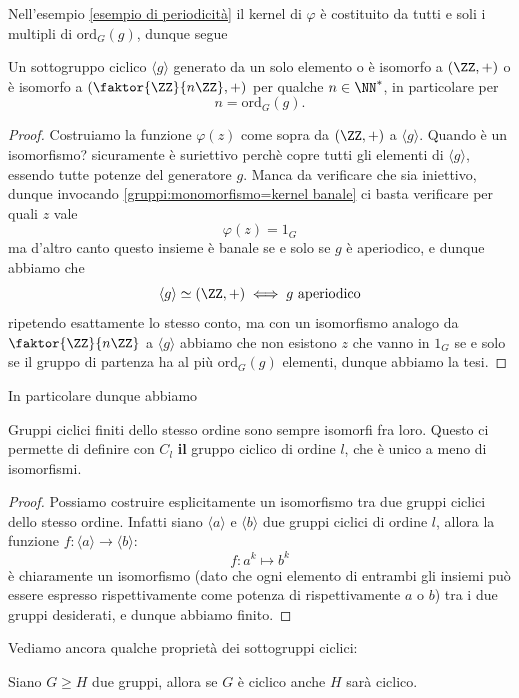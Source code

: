 \documentclass[11pt]{scrartcl}
\newcommand{\ordine}[2]{\text{ord}_{#1}\left(#2\right)}
\begin{document}
	
	Nell'esempio \ref{esempio di periodicità} il kernel di $\varphi$ è costituito da tutti e soli i multipli di $\ordine{G}{g}$, dunque segue
	\begin{corollary}
		Un sottogruppo ciclico $\langle g \rangle$ generato da un solo elemento o è isomorfo a $(\ZZ,+)$ o è isomorfo a $\left(\faktor{\ZZ}{n\ZZ},+\right)$ per qualche $n\in\NN^*$, in particolare per 
		$$n=\ordine{G}{g}.$$
	\end{corollary}
	\begin{proof}
		Costruiamo la funzione $\varphi(z)$ come sopra da $(\ZZ,+)$ a $\langle g \rangle$. Quando è un isomorfismo? sicuramente è suriettivo perchè copre tutti gli elementi di $\langle g \rangle$, essendo tutte potenze del generatore $g$. Manca da verificare che sia iniettivo, dunque invocando \ref{gruppi:monomorfismo=kernel banale} ci basta verificare per quali $z$ vale
		$$\varphi(z)=1_G$$
		ma d'altro canto questo insieme è banale se e solo se $g$ è aperiodico, e dunque abbiamo che 
		$$\langle g \rangle \simeq (\ZZ,+) \iff g \text{ aperiodico}$$
		ripetendo esattamente lo stesso conto, ma con un isomorfismo analogo da $\faktor{\ZZ}{n\ZZ}$ a $\langle g \rangle$ abbiamo che non esistono $z$ che vanno in $1_G$ se e solo se il gruppo di partenza ha al più $\ordine{G}{g}$ elementi, dunque abbiamo la tesi.
	\end{proof}
	In particolare dunque abbiamo
	\begin{corollary}
		Gruppi ciclici finiti dello stesso ordine sono sempre isomorfi fra loro. Questo ci permette di definire con $C_l$ \textbf{il} gruppo ciclico di ordine $l$, che è unico a meno di isomorfismi.
	\end{corollary}
	\begin{proof}
		Possiamo costruire esplicitamente un isomorfismo tra due gruppi ciclici dello stesso ordine. Infatti siano $\langle a \rangle$ e $\langle b \rangle$ due gruppi ciclici di ordine $l$, allora la funzione $f:\langle a \rangle \to \langle b \rangle$:
		$$f:a^k\mapsto b^k$$
		è chiaramente un isomorfismo (dato che ogni elemento di entrambi gli insiemi può essere espresso rispettivamente come potenza di rispettivamente $a$ o $b$) tra i due gruppi desiderati, e dunque abbiamo finito. 
	\end{proof}
	Vediamo ancora qualche proprietà dei sottogruppi ciclici:
	\begin{lemma}
		Siano $G\ge H$ due gruppi, allora se $G$ è ciclico anche $H$ sarà ciclico.
	\end{lemma}
\end{document}
